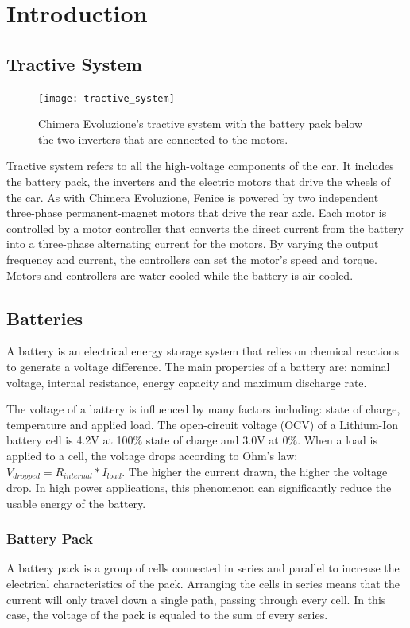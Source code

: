 \chapter{Introduction}

\section{Tractive System}
\begin{figure}[h]
    \centering
    \texttt{[image: tractive\_system]}
    \caption{Chimera Evoluzione's tractive system with the battery pack below the two inverters that are connected to the motors.}
    \label{fig:tractive_system}
\end{figure}
Tractive system refers to all the high-voltage components of the car. It includes the battery pack, the inverters and the electric motors that drive the wheels of the car.
As with Chimera Evoluzione, Fenice is powered by two independent three-phase permanent-magnet motors that drive the rear axle. Each motor is controlled by a motor controller that converts the direct current from the battery into a three-phase alternating current for the motors. By varying the output frequency and current, the controllers can set the motor's speed and torque. Motors and controllers are water-cooled while the battery is air-cooled.

\section{Batteries}
A battery is an electrical energy storage system that relies on chemical reactions to generate a voltage difference. The main properties of a battery are: nominal voltage, internal resistance, energy capacity and maximum discharge rate.

The voltage of a battery is influenced by many factors including: state of charge, temperature and applied load. The open-circuit voltage (OCV) of a Lithium-Ion battery cell is 4.2V at 100\% state of charge and 3.0V at 0\%.
When a load is applied to a cell, the voltage drops according to Ohm's law: $V_{dropped} = R_{internal}*I_{load}$. The higher the current drawn, the higher the voltage drop. In high power applications, this phenomenon can significantly reduce the usable energy of the battery.

\subsection{Battery Pack}
A battery pack is a group of cells connected in series and parallel to increase the electrical characteristics of the pack. Arranging the cells in series means that the current will only travel down a single path, passing through every cell. In this case, the voltage of the pack is equaled to the sum of every series.

